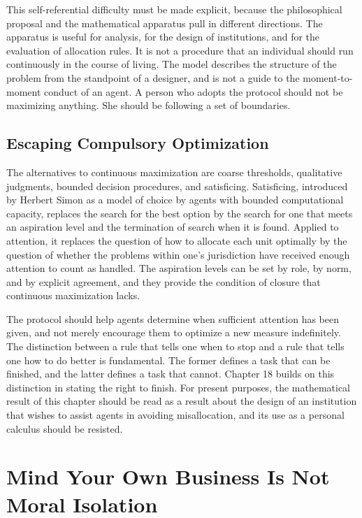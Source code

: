 \documentclass[11pt]{report}
\theoremstyle{definition}
\theoremstyle{remark}
\begin{document}
This self-referential difficulty must be made explicit, because the philosophical proposal and the mathematical apparatus pull in different directions. The apparatus is useful for analysis, for the design of institutions, and for the evaluation of allocation rules. It is not a procedure that an individual should run continuously in the course of living. The model describes the structure of the problem from the standpoint of a designer, and is not a guide to the moment-to-moment conduct of an agent. A person who adopts the protocol should not be maximizing anything. She should be following a set of boundaries.

\section{Escaping Compulsory Optimization}

The alternatives to continuous maximization are coarse thresholds, qualitative judgments, bounded decision procedures, and satisficing. Satisficing, introduced by Herbert Simon \cite{simon56} as a model of choice by agents with bounded computational capacity, replaces the search for the best option by the search for one that meets an aspiration level and the termination of search when it is found. Applied to attention, it replaces the question of how to allocate each unit optimally by the question of whether the problems within one's jurisdiction have received enough attention to count as handled. The aspiration levels can be set by role, by norm, and by explicit agreement, and they provide the condition of closure that continuous maximization lacks.

The protocol should help agents determine when sufficient attention has been given, and not merely encourage them to optimize a new measure indefinitely. The distinction between a rule that tells one when to stop and a rule that tells one how to do better is fundamental. The former defines a task that can be finished, and the latter defines a task that cannot. Chapter 18 builds on this distinction in stating the right to finish. For present purposes, the mathematical result of this chapter should be read as a result about the design of an institution that wishes to assist agents in avoiding misallocation, and its use as a personal calculus should be resisted.

\chapter{Mind Your Own Business Is Not Moral Isolation}
\end{document}
